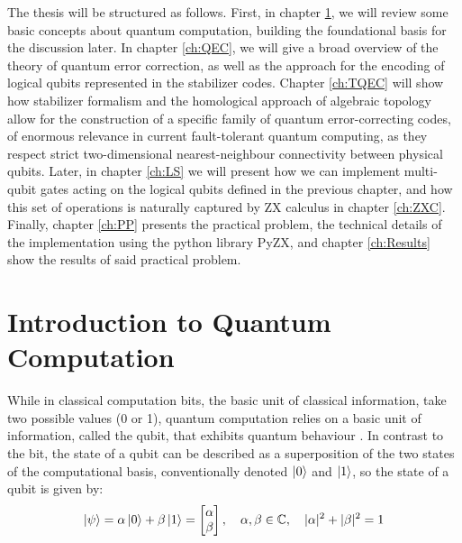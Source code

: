\documentclass[12pt, twoside, openany]{book}
\begin{document}
The thesis will be structured as follows. First, in chapter \ref{ch:IQC}, we will review some basic concepts about quantum computation, building the foundational basis for the discussion later. In chapter \ref{ch:QEC}, we will give a broad overview of the theory of quantum error correction, as well as the approach for the encoding of logical qubits represented in the stabilizer codes. Chapter \ref{ch:TQEC} will show how stabilizer formalism and the homological approach of algebraic topology allow for the construction of a specific family of quantum error-correcting codes, of enormous relevance in current fault-tolerant quantum computing, as they respect strict two-dimensional nearest-neighbour connectivity between physical qubits. Later, in chapter \ref{ch:LS} we will present how we can implement multi-qubit gates acting on the logical qubits defined in the previous chapter, and how this set of operations is naturally captured by ZX calculus in chapter \ref{ch:ZXC}. Finally, chapter \ref{ch:PP} presents the practical problem, the technical details of the implementation using the python library PyZX, and chapter \ref{ch:Results} show the results of said practical problem.

\chapter{Introduction to Quantum Computation} \label{ch:IQC}

While in classical computation bits, the basic unit of classical information, take two possible values (0 or 1), quantum computation relies on a basic unit of information, called the qubit, that exhibits quantum behaviour \cite{NielsenChuang2010}. In contrast to the bit, the state of a qubit can be described as a superposition of the two states of the computational basis, conventionally denoted $\ket{0}$ and $\ket{1}$, so the state of a qubit is given by:
\begin{equation} \label{qubit}
    \ket{\psi} = \alpha \ket{0} + \beta \ket{1} =
    \begin{bmatrix}
    \alpha \\
    \beta
    \end{bmatrix}
    , \quad \alpha, \beta \in \mathbb{C}, \quad |\alpha|^2 + |\beta|^2 = 1
\end{equation}
\end{document}

